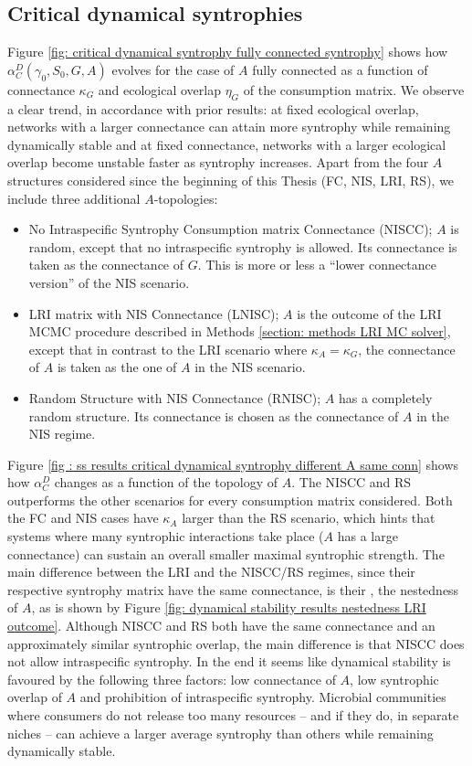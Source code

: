 \documentclass[12pt, titlepage]{report}
\begin{document}
\subsection{Critical dynamical syntrophies}\label{sec: results structural stability critical dynamical syntrophies}
Figure \ref{fig: critical dynamical syntrophy fully connected syntrophy} shows how $\alpha_C^D(\gamma_0, S_0, G, A)$ evolves for the case of $A$ fully connected as a function of connectance $\kappa_G$ and ecological overlap $\eta_G$ of the consumption matrix. We observe a clear trend, in accordance with prior results: at fixed ecological overlap, networks with a larger connectance can attain more syntrophy while remaining dynamically stable and at fixed connectance, networks with a larger ecological overlap become unstable faster as syntrophy increases. Apart from the four $A$ structures considered since the beginning of this Thesis (FC, NIS, LRI, RS), we include three additional $A$-topologies:
\begin{itemize}
\item No Intraspecific Syntrophy Consumption matrix Connectance (NISCC); $A$ is random, except that no intraspecific syntrophy is allowed. Its connectance is taken as the connectance of $G$. This is more or less a  ``lower connectance version'' of the NIS scenario.

\item LRI matrix with NIS Connectance (LNISC); $A$ is the outcome of the LRI MCMC procedure described in Methods \ref{section: methods LRI MC solver}, except that in contrast to the LRI scenario where $\kappa_A=\kappa_G$, the connectance of $A$ is taken as the one of $A$ in the NIS scenario.

\item Random Structure with NIS Connectance (RNISC); $A$ has a completely random structure. Its connectance is chosen as the connectance of $A$ in the NIS regime.
\end{itemize}
Figure \ref{fig : ss results critical dynamical syntrophy different A same conn} shows how $\alpha_C^D$ changes as a function of the topology of $A$. The NISCC and RS outperforms the other scenarios for every consumption matrix considered. Both the FC and NIS cases have $\kappa_A$ larger than the RS scenario, which hints that systems where many syntrophic interactions take place (\ie $A$ has a large connectance) can sustain an overall smaller maximal syntrophic strength. The main difference between the LRI and the NISCC/RS regimes, since their respective syntrophy matrix have the same connectance, is their , \ie the nestedness of $A$, as is shown by Figure \ref{fig: dynamical stability results nestedness LRI outcome}. Although NISCC and RS both have the same connectance and an approximately similar syntrophic overlap, the main difference is that NISCC does not allow intraspecific syntrophy. In the end it seems like dynamical stability is favoured by the following three factors: low connectance of $A$, low syntrophic overlap of $A$ and prohibition of intraspecific syntrophy. Microbial communities where consumers do not release too many resources -- and if they do, in separate niches -- can achieve a larger average syntrophy than others while remaining dynamically stable.
\end{document}
